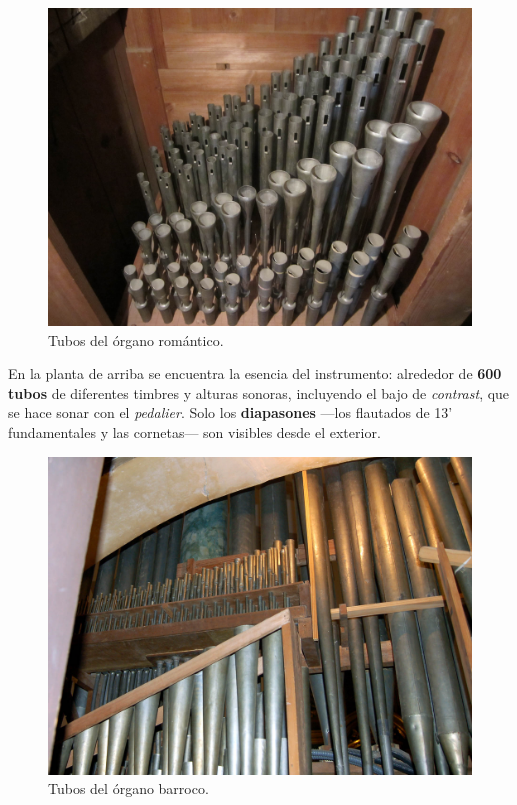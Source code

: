 \begin{figure}[H]
	\noindent \begin{centering}
		\includegraphics[width=\linewidth*2/3]{capitulo3/romantico}
		\par\end{centering}
	\smallskip
	\caption{\label{fig:romantico} Tubos del órgano romántico.}
\end{figure} 

\smallskip

En la planta de arriba se encuentra la esencia del instrumento: alrededor de \textbf{600 tubos} de diferentes timbres y alturas sonoras, incluyendo el bajo de \textit{contrast}, que se hace sonar con el \textit{pedalier}. Solo los \textbf{diapasones} ---los flautados de 13' fundamentales y las cornetas--- son visibles desde el exterior.

\smallskip

\begin{figure}[H]
	\noindent \begin{centering}
		\includegraphics[width=\linewidth*2/3]{capitulo3/barroco}
		\par\end{centering}
	\smallskip
	\caption{\label{fig:barroco} Tubos del órgano barroco.}
\end{figure} 

